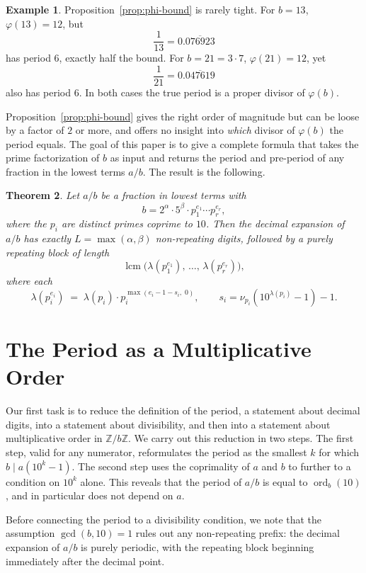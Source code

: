 \documentclass[12pt]{amsart}
\newtheorem{theorem}{Theorem}[section]
\theoremstyle{definition}
\newtheorem{example}[theorem]{Example}
\theoremstyle{remark}
\newcommand{\Z}{\mathbb{Z}}
\newcommand{\ord}{\operatorname{ord}}
\newcommand{\lcm}{\operatorname{lcm}}
\begin{document}
\begin{example}\label{ex:phi-not-tight}
Proposition~\ref{prop:phi-bound} is rarely tight. For $b = 13$,
$\varphi(13) = 12$, but
\[
  \frac{1}{13} = 0.\overline{076923}
\]
has period $6$, exactly half the bound. For $b = 21 = 3 \cdot 7$,
$\varphi(21) = 12$, yet
\[
  \frac{1}{21} = 0.\overline{047619}
\]
also has period $6$. In both cases the true period is a proper divisor
of $\varphi(b)$.
\end{example}

Proposition~\ref{prop:phi-bound} gives the right order of magnitude
but can be loose by a factor of $2$ or more, and offers no insight
into \emph{which} divisor of $\varphi(b)$ the period equals. The goal
of this paper is to give a complete formula that
takes the prime factorization of $b$ as input and returns the period and
pre-period of any fraction in the lowest terms $a/b$. The result is the following.

\medskip
\begin{theorem}\label{lem:main-formula}
Let $a/b$ be a fraction in lowest terms with
\[
  b = 2^\alpha \cdot 5^\beta \cdot p_1^{e_1} \cdots p_r^{e_r},
\]
where the $p_i$ are distinct primes coprime to $10$. Then the decimal
expansion of $a/b$ has exactly $L = \max(\alpha, \beta)$ non-repeating
digits, followed by a purely repeating block of length
\[
  \lcm\!\bigl(\lambda(p_1^{e_1}),\, \ldots,\, \lambda(p_r^{e_r})\bigr),
\]
where each
\[
  \lambda(p_i^{e_i}) \;=\; \lambda(p_i)\cdot p_i^{\max(e_i - 1 - s_i,\; 0)},
  \qquad s_i = \nu_{p_i}(10^{\lambda(p_i)} - 1) - 1.
\]
\end{theorem}
\medskip

\section{The Period as a Multiplicative Order}\label{sec:order}

Our first task is to reduce the definition of the period, a statement about decimal digits, into a statement about divisibility, and then into a statement about multiplicative order in $\Z / b \Z$. We carry out this reduction 
in two steps. The first step, valid for any numerator, reformulates the 
period as the smallest $k$ for which $b \mid a(10^k - 1)$. The second 
step uses the coprimality of $a$ and $b$ to further to a
condition on $10^k$ alone. This reveals that the period of $a/b$ is 
equal to $\ord_b(10)$, and in particular does not depend on $a$.

Before connecting the period to a divisibility condition, we note that 
the assumption $\gcd(b, 10) = 1$ rules out any non-repeating prefix: 
the decimal expansion of $a/b$ is purely periodic, with the repeating 
block beginning immediately after the decimal point.
\end{document}
